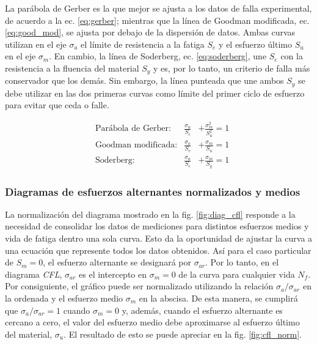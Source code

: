 La parábola de Gerber es la que mejor se ajusta a los datos de falla experimental, de acuerdo a la ec. \ref{eq:gerber}; mientras que la línea de Goodman modificada, ec. \ref{eq:good_mod}, se ajusta por debajo de la dispersión de datos. Ambas curvas utilizan en el eje $\sigma_a$ el límite de resistencia a la fatiga $S_e$ y el esfuerzo último $S_u$ en el eje $\sigma_m$. En cambio, la línea de Soderberg, ec. \ref{eq:soderberg}, une $S_e$ con la resistencia a la fluencia del material $S_y$ y es, por lo tanto, un criterio de falla más conservador que los demás. Sin embargo, la línea punteada que une ambos $S_y$ se debe utilizar en las dos primeras curvas como límite del primer ciclo de esfuerzo para evitar que ceda o falle. \cite{norton2011machine}

\begin{centering}
\begin{align}
&\text{Parábola de Gerber:}&	\frac{\sigma_a}{S_e} &+ \frac{\sigma_m^2}{S_u^2} = 1 \label{eq:gerber}\\
&\text{Goodman modificada:}&	\frac{\sigma_a}{S_e} &+ \frac{\sigma_m}{S_u} = 1 \label{eq:good_mod}\\
&\text{Soderberg:}&	\frac{\sigma_a}{S_e} &+ \frac{\sigma_m}{S_y} = 1 \label{eq:soderberg}
\end{align}
\end{centering}

\subsubsection{Diagramas de esfuerzos alternantes normalizados y medios}

La normalización del diagrama mostrado en la fig. \ref{fig:diag_cfl} responde a la necesidad de consolidar los datos de mediciones para distintos esfuerzos medios y vida de fatiga dentro una sola curva. Esto da la oportunidad de ajustar la curva a una ecuación que represente todos los datos obtenidos. Así para el caso particular de $S_m=0$, el esfuerzo alternante se designará por $\sigma_{ar}$. Por lo tanto, en el diagrama \textit{CFL}, $\sigma_{ar}$ es el intercepto en $\sigma_m=0$ de la curva para cualquier vida $N_f$. Por consiguiente, el gráfico puede ser normalizado utilizando la relación $\sigma_a/\sigma_{ar}$ en la ordenada y el esfuerzo medio $\sigma_m$ en la abscisa. De esta manera, se cumplirá que $\sigma_a/\sigma_{ar}=1$ cuando $\sigma_m=0$ y, además, cuando el esfuerzo alternante es cercano a cero, el valor del esfuerzo medio debe aproximarse al esfuerzo último del material, $\sigma_u$. El resultado de esto se puede apreciar en la fig. \ref{fig:cfl_norm}.

